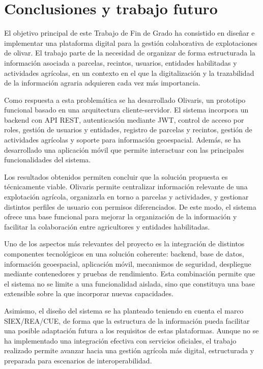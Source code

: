 \chapter{Conclusiones y trabajo futuro}

El objetivo principal de este Trabajo de Fin de Grado ha consistido en diseñar e implementar una plataforma digital para la gestión colaborativa de explotaciones de olivar. El 
trabajo parte de la necesidad de organizar de forma estructurada la información asociada a parcelas, recintos, usuarios, entidades habilitadas y actividades agrícolas, en un 
contexto en el que la digitalización y la trazabilidad de la información agraria adquieren cada vez más importancia.

Como respuesta a esta problemática se ha desarrollado Olivaris, un prototipo funcional basado en una arquitectura cliente-servidor. El sistema incorpora un backend con API REST, 
autenticación mediante JWT, control de acceso por roles, gestión de usuarios y entidades, registro de parcelas y recintos, gestión de actividades agrícolas y soporte para información 
geoespacial. Además, se ha desarrollado una aplicación móvil que permite interactuar con las principales funcionalidades del sistema.

Los resultados obtenidos permiten concluir que la solución propuesta es técnicamente viable. Olivaris permite centralizar información relevante de una explotación agrícola, organizarla 
en torno a parcelas y actividades, y gestionar distintos perfiles de usuario con permisos diferenciados. De este modo, el sistema ofrece una base funcional para mejorar la organización 
de la información y facilitar la colaboración entre agricultores y entidades habilitadas.

Uno de los aspectos más relevantes del proyecto es la integración de distintos componentes tecnológicos en una solución coherente: backend, base de datos, información geoespacial, aplicación
móvil, mecanismos de seguridad, despliegue mediante contenedores y pruebas de rendimiento. Esta combinación permite que el sistema no se limite a una funcionalidad aislada, sino que constituya 
una base extensible sobre la que incorporar nuevas capacidades.

Asimismo, el diseño del sistema se ha planteado teniendo en cuenta el marco SIEX/REA/CUE, de forma que la estructura de la información pueda facilitar una posible adaptación futura a los requisitos 
de estas plataformas. Aunque no se ha implementado una integración efectiva con servicios oficiales, el trabajo realizado permite avanzar hacia una gestión agrícola más digital, estructurada y preparada 
para escenarios de interoperabilidad.

